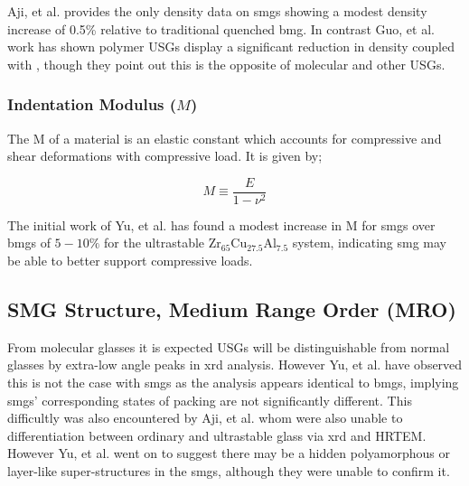 \documentclass[a4paper,12pt,oneside]{report}%
\begin{document}
Aji, et al. \cite{Aji2013} provides the only density data on \glspl{smg} showing a modest density increase of 0.5\% relative to traditional quenched \gls{bmg}. In contrast Guo, et al. \cite{Guo2012} work has shown polymer USGs display a significant reduction in density coupled with \dTg, though they point out this is the opposite of molecular and other USGs. 

\subsubsection{Indentation Modulus ($M$)}
The \gls{M} of a material is an elastic constant which accounts for compressive and shear deformations with compressive load. It is given by;

\begin{equation}
M \equiv 
\frac{E}
{1-\nu^{2}}
\label{equ:IndentModulus}
\end{equation}

The initial work of Yu, et al. \cite{Yu2013} has found a modest increase in \gls{M} for \glspl{smg} over \glspl{bmg} of $5- 10\%$ for the ultrastable Zr$_{65}$Cu$_{27.5}$Al$_{7.5}$ system, indicating \gls{smg} may be able to better support compressive loads. 

\subsection{SMG Structure, Medium Range Order (MRO)} 
From molecular glasses it is expected USGs will be distinguishable from normal glasses by extra-low angle peaks in \gls{xrd} analysis. However Yu, et al. \cite{Yu2013} have observed this is not the case with \glspl{smg} as the analysis appears identical to \glspl{bmg}, implying \glspl{smg}' corresponding states of packing are not significantly different. This difficultly was also encountered by Aji, et al. \cite{Aji2013} whom were also unable to differentiation between ordinary and ultrastable glass via \gls{xrd} and HRTEM. However Yu, et al. \cite{Yu2013} went on to suggest there may be a hidden polyamorphous or layer-like super-structures in the \glspl{smg}, although they were unable to confirm it. 
\end{document}
